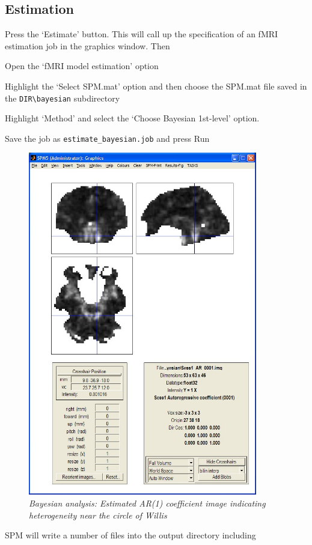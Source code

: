 \subsection{Estimation}

Press the `Estimate' button. This will call up the specification of an fMRI estimation job in the graphics window. Then
\bi
\item{Open the `fMRI model estimation' option}
\item{Highlight the `Select SPM.mat' option and then choose the SPM.mat
file saved in the \verb!DIR\bayesian! subdirectory}
\item{Highlight `Method' and select the `Choose Bayesian 1st-level' option.}
\item{Save the job as \verb!estimate_bayesian.job! and press Run}
\ei
\begin{figure}
\begin{center}
\includegraphics[width=100mm]{faces/face_ar1}
\caption{\em Bayesian analysis: Estimated AR(1) coefficient image indicating heterogeneity near the circle of Willis \label{face_ar1} }
\end{center}
\end{figure}
SPM will write a number of files into the output directory including 
